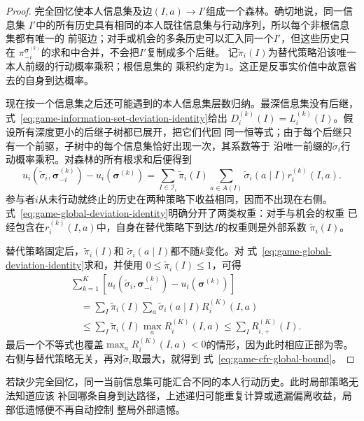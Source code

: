 \begin{proof}
完全回忆使本人信息集及边\((I,a)\to I'\)组成一个森林。确切地说，同一信息集
\(I'\)中的所有历史具有相同的本人既往信息集与行动序列，所以每个非根信息集都有唯一的
前驱边；对手或机会的多条历史可以汇入同一个\(I'\)，但这些历史只在
\(\pi_{-i}^{\bm{\sigma}^{(k)}}\)的求和中合并，不会把\(I'\)复制成多个后继。
记\(\widetilde{\pi}_i(I)\)为替代策略沿该唯一本人前缀的行动概率乘积；根信息集的
乘积约定为\(1\)。这正是反事实价值中故意省去的自身到达概率。

现在按一个信息集之后还可能遇到的本人信息集层数归纳。最深信息集没有后继，
式~\eqref{eq:game-information-set-deviation-identity}给出
\(D_i^{(k)}(I)=L_i^{(k)}(I)\)。假设所有深度更小的后继子树都已展开，把它们代回
同一恒等式；由于每个后继只有一个前驱，子树中的每个信息集恰好出现一次，其系数等于
沿唯一前缀的\(\widetilde{\sigma}_i\)行动概率乘积。对森林的所有根求和后便得到
\begin{equation}
  u_i(\widetilde{\sigma}_i,\bm{\sigma}_{-i}^{(k)})
  -
  u_i(\bm{\sigma}^{(k)})
  =
  \sum_{I\in\mathcal{I}_i}
  \widetilde{\pi}_i(I)
  \sum_{a\in A(I)}
  \widetilde{\sigma}_i(a\mid I)r_i^{(k)}(I,a).
  \label{eq:game-global-deviation-identity}
\end{equation}
参与者\(i\)从未行动就终止的历史在两种策略下收益相同，因而不出现在右侧。
式~\eqref{eq:game-global-deviation-identity}明确分开了两类权重：对手与机会的权重
已经包含在\(r_i^{(k)}(I,a)\)中，自身在替代策略下到达\(I\)的权重则是外部系数
\(\widetilde{\pi}_i(I)\)。

替代策略固定后，\(\widetilde{\pi}_i(I)\)和
\(\widetilde{\sigma}_i(a\mid I)\)都不随\(k\)变化。对
式~\eqref{eq:game-global-deviation-identity}求和，并使用
\(0\leq\widetilde{\pi}_i(I)\leq1\)，可得
\begin{align*}
  &\sum_{k=1}^{K}
  \left[
    u_i(\widetilde{\sigma}_i,\bm{\sigma}_{-i}^{(k)})
    -
    u_i(\bm{\sigma}^{(k)})
  \right]\\
  &\quad=
  \sum_I
  \widetilde{\pi}_i(I)
  \sum_a
  \widetilde{\sigma}_i(a\mid I)R_i^{(K)}(I,a)\\
  &\quad\leq
  \sum_I
  \widetilde{\pi}_i(I)
  \max_a R_i^{(K)}(I,a)
  \leq
  \sum_I R_{i,+}^{(K)}(I).
\end{align*}
最后一个不等式也覆盖\(\max_aR_i^{(K)}(I,a)<0\)的情形，因为此时相应正部为零。
右侧与替代策略无关，再对\(\widetilde{\sigma}_i\)取最大，就得到
式~\eqref{eq:game-cfr-global-bound}。
\end{proof}

若缺少完全回忆，同一当前信息集可能汇合不同的本人行动历史。此时局部策略无法知道应该
补回哪条自身到达路径，上述递归可能重复计算或遗漏偏离收益，局部低遗憾便不再自动控制
整局外部遗憾。

